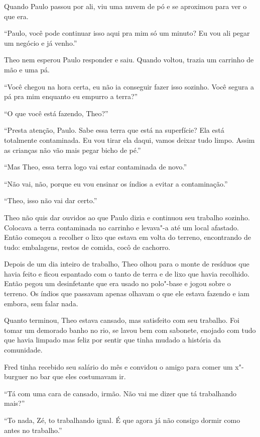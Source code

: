 Quando Paulo passou por ali, viu uma nuvem de pó e se aproximou para ver
o que era.

``Paulo, você pode continuar isso aqui pra mim só um minuto? Eu vou ali
pegar um negócio e já venho.''

Theo nem esperou Paulo responder e saiu. Quando voltou, trazia um
carrinho de mão e uma pá.

``Você chegou na hora certa, eu não ia conseguir fazer isso sozinho.
Você segura a pá pra mim enquanto eu empurro a terra?''

``O que você está fazendo, Theo?''

``Presta atenção, Paulo. Sabe essa terra que está na superfície? Ela
está totalmente contaminada. Eu vou tirar ela daqui, vamos deixar tudo
limpo. Assim as crianças não vão mais pegar bicho de pé.''

``Mas Theo, essa terra logo vai estar contaminada de novo.''

``Não vai, não, porque eu vou ensinar os índios a evitar a
contaminação.''

``Theo, isso não vai dar certo.''

Theo não quis dar ouvidos ao que Paulo dizia e continuou seu trabalho
sozinho. Colocava a terra contaminada no carrinho e levava"-a até um
local afastado. Então começou a recolher o lixo que estava em volta do
terreno, encontrando de tudo: embalagens, restos de comida, cocô de
cachorro.

Depois de um dia inteiro de trabalho, Theo olhou para o monte de
resíduos que havia feito e ficou espantado com o tanto de terra e de
lixo que havia recolhido. Então pegou um desinfetante que era usado no
polo"-base e jogou sobre o terreno. Os índios que passavam apenas olhavam
o que ele estava fazendo e iam embora, sem falar nada.

Quanto terminou, Theo estava cansado, mas satisfeito com seu trabalho.
Foi tomar um demorado banho no rio, se lavou bem com sabonete, enojado
com tudo que havia limpado mas feliz por sentir que tinha mudado a
história da comunidade.

\asterisc


Fred tinha recebido seu salário do mês e convidou o amigo para comer um
x"-burguer no bar que eles costumavam ir.

``Tá com uma cara de cansado, irmão. Não vai me dizer que tá trabalhando
mais?''

``To nada, Zé, to trabalhando igual. É que agora já não consigo dormir
como antes no trabalho.''

